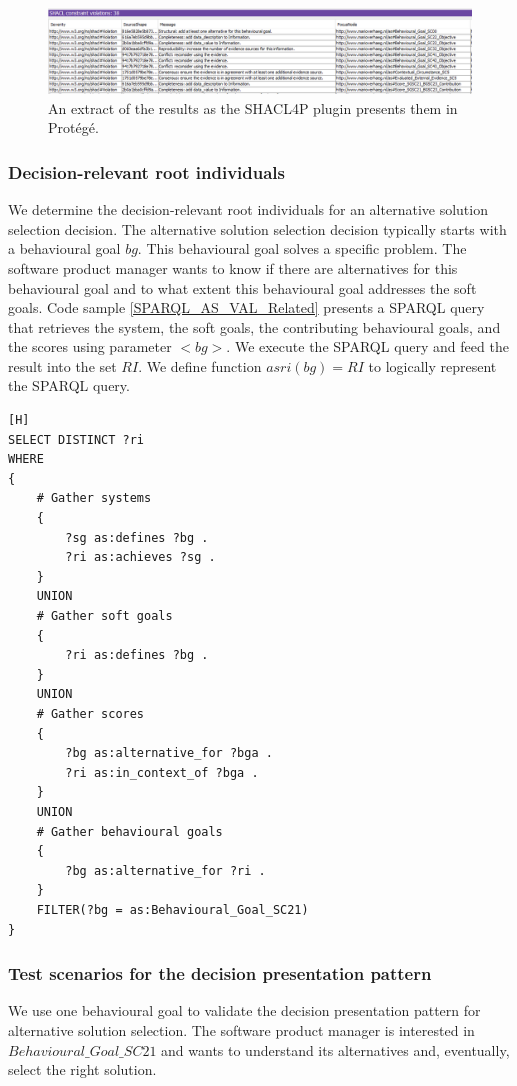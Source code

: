 \begin{figure}[H]
\centering
  \includegraphics[width=17cm]{../../Images/05_Validation/05_AS_SC_Results.png}
  \caption{An extract of the results as the SHACL4P plugin presents them in Prot\'eg\'e.}
  \label{fig:RP_AS_Results}
\end{figure}

\subsubsection{Decision-relevant root individuals}
We determine the decision-relevant root individuals for an alternative solution selection decision. The alternative solution selection decision typically starts with a behavioural goal $bg$. This behavioural goal solves a specific problem. The software product manager wants to know if there are alternatives for this behavioural goal and to what extent this behavioural goal addresses the soft goals. Code sample \ref{SPARQL_AS_VAL_Related} presents a SPARQL query that retrieves the system, the soft goals, the contributing behavioural goals, and the scores using parameter $<bg>$. We execute the SPARQL query and feed the result into the set $RI$. We define function $asri(bg) = RI$ to logically represent the SPARQL query. 

\begin{lstlisting}[float,language=SPARQL1,caption={A SPARQL query that retrieves the system, the required soft goals, contributing behavioural goals, and scores using parameter $<bg>$.},label={SPARQL_AS_VAL_Related}][H]
SELECT DISTINCT ?ri
WHERE 
{
	# Gather systems
	{
		?sg as:defines ?bg .
		?ri as:achieves ?sg .		
	}
	UNION
	# Gather soft goals
	{
		?ri as:defines ?bg .
	}
	UNION
	# Gather scores
	{
		?bg as:alternative_for ?bga .
		?ri as:in_context_of ?bga .
	}
	UNION
	# Gather behavioural goals
	{
		?bg as:alternative_for ?ri .
	}
	FILTER(?bg = as:Behavioural_Goal_SC21)
}
\end{lstlisting}

\subsubsection{Test scenarios for the decision presentation pattern}
We use one behavioural goal to validate the decision presentation pattern for alternative solution selection. The software product manager is interested in $Behavioural\_Goal\_SC21$ and wants to understand its alternatives and, eventually, select the right solution. 


